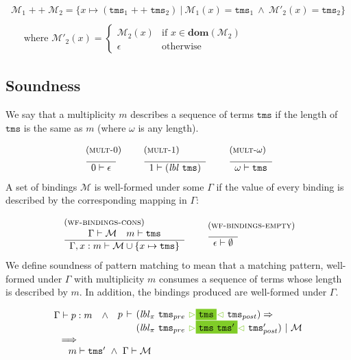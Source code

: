 \documentclass{article}
\makeatletter
\newcommand{\rulename}{\textsc}
\newcommand{\irule}[3]{\begin{array}{l}{~\small\mbox{(\rulename{#1})}}\\\;\frac{\begin{array}{c}#2\end{array}}{\begin{array}{l}#3\end{array}}\end{array}}
\newcommand{\cursorColor}{LimeGreen}
\newcommand{\lbl}{\ensuremath{\mathit{lbl}}}
\newcommand{\tms}{\ensuremath{\mathtt{tms}}}
\newcommand{\mstart}{\ensuremath{\textcolor{\cursorColor}{\rhd}}}
\newcommand{\mend}{\ensuremath{\textcolor{\cursorColor}{\lhd}}}
\newcommand{\bindings}{\ensuremath{\mathcal{M}}}
\newcommand{\nobindings}{\ensuremath{\emptyset}}
\newcommand{\concat}{\ensuremath{\mathop{+\!\!+}}}
\newcommand{\select}[1]{\mstart\colorbox{\cursorColor}{$#1$}\mend}
\newcommand{\xmatches}[4]{\ensuremath{
    \begin{array}{r@{\hspace{4pt}}c@{\hspace{4pt}}l}%
      #1 & \vdash & #2 \Rightarrow\\
         &        & #3 ~|~ #4
    \end{array}}}
\newcommand{\wfp}[3]{\ensuremath{#1 \vdash #2 : #3}}
\makeatother
\begin{document}
\[
  \begin{array}{l}
    \bindings_1 \concat \bindings_2 =
      \{x \mapsto (\tms_1 \concat \tms_2) ~|~
        \bindings_1(x) = \tms_1 ~\land~
        \bindings'_2(x) = \tms_2
      \}
    \\\\\quad
    \text{ where } \bindings'_2(x) =
    \begin{cases}
      \bindings_2(x) & \text{if } x \in \mathbf{dom}(\bindings_2)\\
      \epsilon & \text{otherwise}
    \end{cases}
  \end{array}
\]

\subsection{Soundness}

We say that a multiplicity $m$ describes a sequence of terms
$\tms$ if the length of $\tms$ is the same as $m$ (where $\omega$
is any length).

\[
  \begin{array}{c}
    \irule{mult-0}{

    }{
    0 \vdash \epsilon
    }
    \quad
    \irule{mult-1}{

    }{
    1 \vdash (\lbl~\tms)
    }
    \quad
    \irule{mult-$\omega$}{

    }{
    \omega \vdash \tms
    }
  \end{array}
\]
%
A set of bindings $\bindings$ is well-formed under some $\Gamma$
if the value of every binding is described by the corresponding
mapping in $\Gamma$:

\[
  \begin{array}{c}
    \irule{wf-bindings-cons}{
    \Gamma \vdash \bindings\quad
    m \vdash \tms
    }{
    \Gamma, x : m \vdash \bindings \cup \{x \mapsto \tms\}
    }
    \quad
    \irule{wf-bindings-empty}{
    }{
    \epsilon \vdash \nobindings
    }
  \end{array}
\]
%
We define soundness of pattern matching to mean that a matching
pattern, well-formed under $\Gamma$ with multiplicity $m$ consumes
a sequence of terms whose length is described by $m$. In addition,
the bindings produced are well-formed under $\Gamma$.

\[
  \begin{array}{l}
    \begin{array}{l}
    \wfp{\Gamma}{p}{m}~~~\land\\
      ~
    \end{array}
    \xmatches{p}{(\lbl_\pi~\tms_{pre}~\select{\tms}~\tms_{post})}
                {(\lbl_\pi~\tms_{pre}~\select{\tms~\tms'}~\tms'_{post})}{\bindings}
    \\
    \quad\implies\\
    \qquad m \vdash \tms' ~\land~ \Gamma \vdash \bindings
  \end{array}
\]
\end{document}
